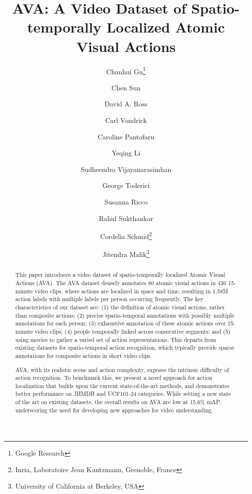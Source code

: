 \documentclass[10pt,twocolumn,letterpaper]{article}
\begin{document}
\title{AVA: A Video Dataset of Spatio-temporally Localized Atomic Visual Actions}

\author{Chunhui Gu\thanks{Google Research} \and Chen Sun\footnotemark[1] \and David A. Ross\footnotemark[1] \and Carl Vondrick\footnotemark[1] \and Caroline Pantofaru\footnotemark[1] \and  Yeqing Li\footnotemark[1] \and Sudheendra Vijayanarasimhan\footnotemark[1] \and George Toderici\footnotemark[1] \and Susanna Ricco\footnotemark[1] \and Rahul Sukthankar\footnotemark[1] \and Cordelia Schmid\thanks{Inria, Laboratoire Jean Kuntzmann, Grenoble, France}\textsuperscript{ } \footnotemark[1] \and Jitendra Malik\thanks{University of California at Berkeley, USA}\textsuperscript{ } \footnotemark[1]}

\maketitle
\thispagestyle{empty}

\newcommand{\numClasses}{80}
\newcommand{\numMovies}{430}
\newcommand{\numClips}{386k}
\newcommand{\numBBoxes}{614k}
\newcommand{\numActions}{1.58M}

\newcommand{\todo}[1]{}
\renewcommand{\todo}[1]{{\color{red} TODO: {#1}}}

\begin{abstract}
  This paper introduces a video dataset of spatio-temporally localized Atomic Visual Actions (AVA). The AVA dataset densely annotates \numClasses{} atomic visual actions in \numMovies{} 15-minute video clips, where actions are localized in space and time, resulting in \numActions{} action labels with multiple labels per person occurring frequently. The key characteristics of our dataset are: (1) the definition of atomic visual actions,  rather than composite actions; (2) precise spatio-temporal annotations with possibly multiple annotations for each person; (3) exhaustive annotation of these atomic actions over 15-minute video clips; (4) people temporally linked across consecutive segments; and (5) using movies to gather a varied set of action representations. This departs from existing datasets for spatio-temporal action recognition, which typically provide sparse annotations for composite actions in short video clips.

AVA, with its realistic scene and action complexity, exposes the intrinsic difficulty of action recognition. To benchmark this, we present a novel approach for action localization that builds upon the current state-of-the-art methods, and demonstrates better performance on JHMDB and UCF101-24 categories. While setting a new state of the art on existing datasets, the overall results on AVA are low at 15.6\% mAP, underscoring the need for developing new approaches for video understanding. \end{abstract}
\end{document}
